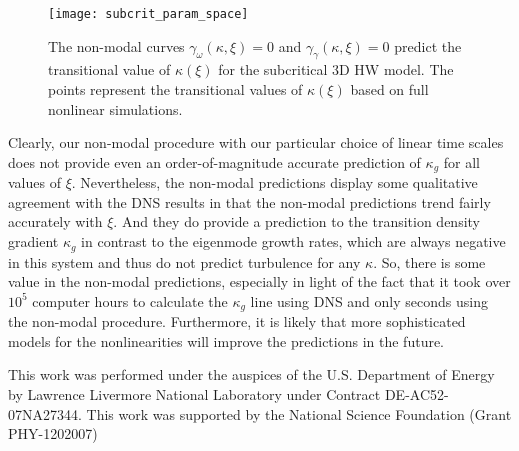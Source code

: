 \documentclass[twocolumn,showkeys,superscriptaddress]{revtex4}
\begin{document}
\begin{figure}
\centerline{\texttt{[image: subcrit\_param\_space]}}
\caption{The non-modal curves $\gamma_{\omega}(\kappa,\xi) = 0$ and $\gamma_{\gamma}(\kappa,\xi) = 0$ predict the transitional value of $\kappa(\xi)$ for the subcritical 3D HW model. The points represent the
transitional values of $\kappa(\xi)$ based on full nonlinear simulations.}
\label{subcrit_param_space}
\end{figure}

Clearly, our non-modal procedure with our particular choice of linear time scales does not provide even an order-of-magnitude accurate prediction of $\kappa_g$ for all values of $\xi$.
Nevertheless, the non-modal predictions display some qualitative agreement with the DNS results in that the non-modal predictions trend fairly accurately with $\xi$. 
And they do provide a prediction to the transition density gradient $\kappa_g$ in contrast to the eigenmode growth rates, which are always negative in this system and thus do not predict turbulence for any $\kappa$.
So, there is some value in the non-modal predictions, especially in light of the fact that it took over $10^5$ computer hours to calculate the $\kappa_g$ line using DNS and only seconds using the non-modal procedure.
Furthermore, it is likely that more sophisticated models for the nonlinearities will improve the predictions in the future.


\begin{acknowledgments}
This work was performed under the auspices of the U.S. Department of Energy by Lawrence Livermore National Laboratory under Contract DE-AC52-07NA27344.
This work was supported by the National Science Foundation (Grant PHY-1202007)
\end{acknowledgments}


%
%
\end{document}
